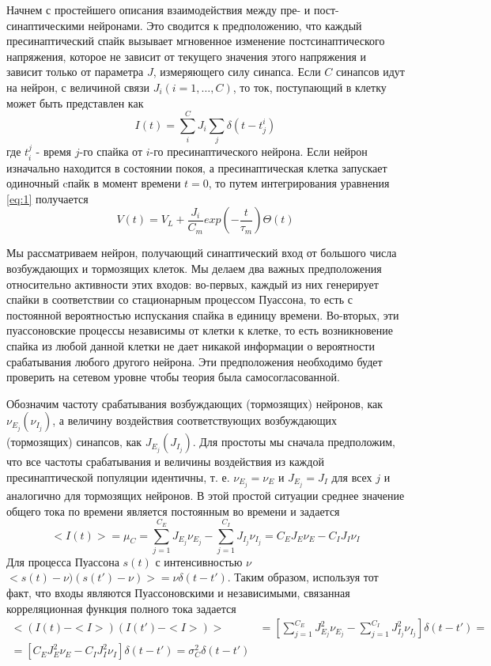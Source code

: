 Начнем с простейшего описания взаимодействия между пре- и пост-синаптическими нейронами. Это сводится к предположению, что каждый пресинаптический спайк вызывает мгновенное изменение постсинаптического напряжения, которое не зависит от текущего значения этого напряжения и зависит только от параметра $J$, измеряющего силу синапса. Если $C$ синапсов идут на нейрон, с величиной связи $J_i (i=1,\ldots,C)$, то ток, поступающий в клетку может быть представлен как
\begin{equation}
	I(t)=\sum_{i}^{C}J_i\sum_{j}\delta(t-t_j^i)
	\label{eq:3}
\end{equation}
где $t_i^j$ - время $j$-го спайка от $i$-го пресинаптического нейрона. Если нейрон изначально находится в состоянии покоя, а пресинаптическая клетка запускает одиночный cпайк в момент времени $t=0$, то путем
интегрирования уравнения \eqref{eq:1} получается
\begin{equation}
	V(t)=V_L+\frac{J_i}{C_m}exp(-\frac{t}{\tau_m})\Theta(t)
	\label{eq:4}
\end{equation}

Мы рассматриваем нейрон, получающий синаптический вход от большого числа возбуждающих и тормозящих клеток. Мы делаем два важных предположения относительно активности этих входов: во-первых, каждый из них генерирует спайки в соответствии со стационарным процессом Пуассона, то есть с постоянной вероятностью испускания спайка в единицу времени. Во-вторых,
эти пуассоновские процессы независимы от клетки к клетке, то есть возникновение спайка из любой данной клетки не дает никакой информации о вероятности срабатывания любого другого нейрона. Эти предположения необходимо будет проверить на сетевом уровне чтобы теория была самосогласованной.

Обозначим частоту срабатывания возбуждающих (тормозящих) нейронов, как $\nu_{E_j} (\nu_{I_j})$, а величину воздействия соответствующих возбуждающих (тормозящих) синапсов, как $J_{E_j} (J_{I_j})$. Для простоты мы сначала предположим, что все частоты срабатывания и величины воздействия из каждой пресинаптической популяции идентичны, т. е. $\nu_{E_j}=\nu_{E} \text{ и } J_{E_j}=J_{I}$ для всех $j$
и аналогично для тормозящих нейронов. В этой простой ситуации среднее значение общего тока по времени является постоянным во времени и задается
\begin{equation}
	<I(t)>=\mu_C=\sum_{j=1}^{C_E}J_{E_j}\nu_{E_j}-\sum_{j=1}^{C_I}J_{I_j}\nu_{I_j}=C_EJ_E\nu_{E}-C_IJ_I\nu_{I}
	\label{eq:5}
\end{equation}
Для процесса Пуассона $s(t)$ с интенсивностью $\nu$ $<s(t)-\nu)(s(t')-\nu)>=\nu\delta(t-t')$. Таким образом,
используя тот факт, что входы являются Пуассоновскими и независимыми, связанная корреляционная функция полного тока задается
\begin{equation}
\begin{split}
		<(I(t)-<I>)(I(t')-<I>)> &
	=\left[\sum_{j=1}^{C_E}J^2_{E_j}\nu_{E_j}-\sum_{j=1}^{C_I}J^2_{I_j}\nu_{I_j}\right]\delta(t-t')= \\
	=[C_EJ^2_E\nu_{E}-C_IJ^2_I\nu_{I}]\delta(t-t')=\sigma_C^2\delta(t-t')
	\label{eq:6}
\end{split}
\end{equation}

